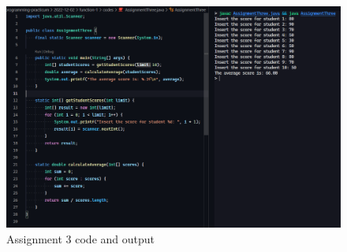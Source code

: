 \documentclass[12pt,titlepage]{article}
\begin{document}
\begin{enumerate}
{        \begin{figure}[h]
            \centering
            \includegraphics[width=\textwidth]{./images/assignment-three.png}
            \caption{Assignment 3 code and output}
        \end{figure}
    }
\end{enumerate}
\end{document}
